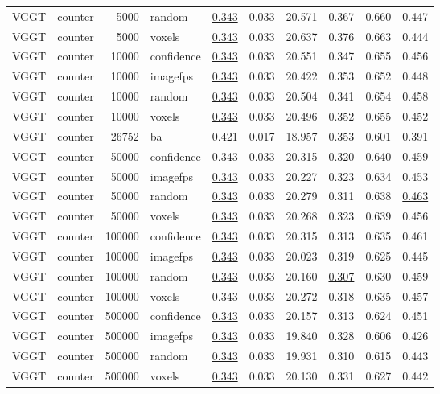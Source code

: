 \begin{table}[H]
\begin{tabular}{llrlrrrrrr}
VGGT & counter & 5000 & random & \underline{0.343} & 0.033 & 20.571 & 0.367 & 0.660 & 0.447 \\
VGGT & counter & 5000 & voxels & \underline{0.343} & 0.033 & 20.637 & 0.376 & 0.663 & 0.444 \\
VGGT & counter & 10000 & confidence & \underline{0.343} & 0.033 & 20.551 & 0.347 & 0.655 & 0.456 \\
VGGT & counter & 10000 & imagefps & \underline{0.343} & 0.033 & 20.422 & 0.353 & 0.652 & 0.448 \\
VGGT & counter & 10000 & random & \underline{0.343} & 0.033 & 20.504 & 0.341 & 0.654 & 0.458 \\
VGGT & counter & 10000 & voxels & \underline{0.343} & 0.033 & 20.496 & 0.352 & 0.655 & 0.452 \\
VGGT & counter & 26752 & ba & 0.421 & \underline{0.017} & 18.957 & 0.353 & 0.601 & 0.391 \\
VGGT & counter & 50000 & confidence & \underline{0.343} & 0.033 & 20.315 & 0.320 & 0.640 & 0.459 \\
VGGT & counter & 50000 & imagefps & \underline{0.343} & 0.033 & 20.227 & 0.323 & 0.634 & 0.453 \\
VGGT & counter & 50000 & random & \underline{0.343} & 0.033 & 20.279 & 0.311 & 0.638 & \underline{0.463} \\
VGGT & counter & 50000 & voxels & \underline{0.343} & 0.033 & 20.268 & 0.323 & 0.639 & 0.456 \\
VGGT & counter & 100000 & confidence & \underline{0.343} & 0.033 & 20.315 & 0.313 & 0.635 & 0.461 \\
VGGT & counter & 100000 & imagefps & \underline{0.343} & 0.033 & 20.023 & 0.319 & 0.625 & 0.445 \\
VGGT & counter & 100000 & random & \underline{0.343} & 0.033 & 20.160 & \underline{0.307} & 0.630 & 0.459 \\
VGGT & counter & 100000 & voxels & \underline{0.343} & 0.033 & 20.272 & 0.318 & 0.635 & 0.457 \\
VGGT & counter & 500000 & confidence & \underline{0.343} & 0.033 & 20.157 & 0.313 & 0.624 & 0.451 \\
VGGT & counter & 500000 & imagefps & \underline{0.343} & 0.033 & 19.840 & 0.328 & 0.606 & 0.426 \\
VGGT & counter & 500000 & random & \underline{0.343} & 0.033 & 19.931 & 0.310 & 0.615 & 0.443 \\
VGGT & counter & 500000 & voxels & \underline{0.343} & 0.033 & 20.130 & 0.331 & 0.627 & 0.442 \\

\end{tabular}
\end{table}
